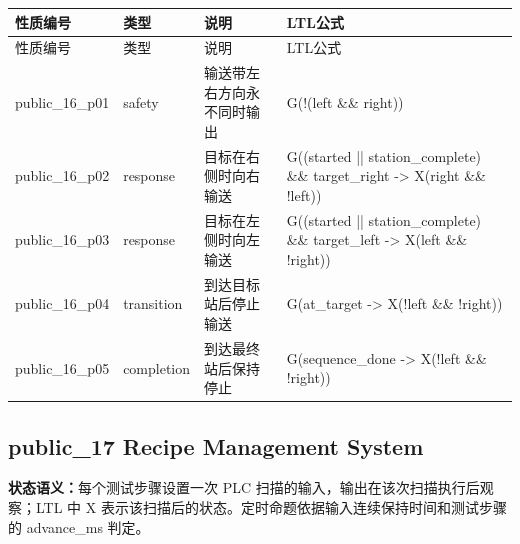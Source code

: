\begin{longtable}{L{2.3cm}L{1.7cm}L{4.1cm}L{5.2cm}}

\toprule

性质编号 & 类型 & 说明 & LTL公式\\

\midrule

\endfirsthead

\toprule

性质编号 & 类型 & 说明 & LTL公式\\

\midrule

\endhead

{\ttfamily public\_16\_p01} & safety & 输送带左右方向永不同时输出 & {\ttfamily G(!(left \&\& right))}\\

{\ttfamily public\_16\_p02} & response & 目标在右侧时向右输送 & {\ttfamily G((started || station\_complete) \&\& target\_right -> X(right \&\& !left))}\\

{\ttfamily public\_16\_p03} & response & 目标在左侧时向左输送 & {\ttfamily G((started || station\_complete) \&\& target\_left -> X(left \&\& !right))}\\

{\ttfamily public\_16\_p04} & transition & 到达目标站后停止输送 & {\ttfamily G(at\_target -> X(!left \&\& !right))}\\

{\ttfamily public\_16\_p05} & completion & 到达最终站后保持停止 & {\ttfamily G(sequence\_done -> X(!left \&\& !right))}\\

\bottomrule

\end{longtable}

\subsection{{\ttfamily public\_17} Recipe Management System}

\noindent\textbf{状态语义：}每个测试步骤设置一次 PLC 扫描的输入，输出在该次扫描执行后观察；LTL 中 X 表示该扫描后的状态。定时命题依据输入连续保持时间和测试步骤的 advance\_ms 判定。

